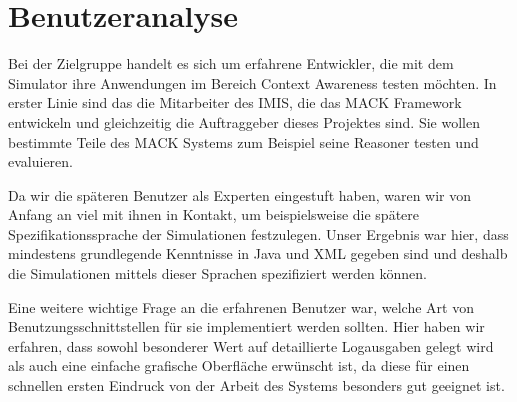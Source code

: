 %

\section{Benutzeranalyse}\label{sec:user_ana}

Bei der Zielgruppe handelt es sich um erfahrene Entwickler, die mit dem Simulator ihre Anwendungen im Bereich Context Awareness testen möchten. In erster Linie sind das die Mitarbeiter des IMIS, die das MACK Framework entwickeln und gleichzeitig die Auftraggeber dieses Projektes sind. Sie wollen bestimmte Teile des MACK Systems zum Beispiel seine Reasoner testen und evaluieren.

Da wir die späteren Benutzer als Experten eingestuft haben, waren wir von Anfang an viel mit ihnen in Kontakt, um beispielsweise die spätere Spezifikationssprache der Simulationen festzulegen. Unser Ergebnis war hier, dass mindestens grundlegende Kenntnisse in Java und XML gegeben sind und deshalb die Simulationen mittels dieser Sprachen spezifiziert werden können.

Eine weitere wichtige Frage an die erfahrenen Benutzer war, welche Art von Benutzungsschnittstellen für sie implementiert werden sollten. Hier haben wir erfahren, dass sowohl besonderer Wert auf detaillierte Logausgaben gelegt wird als auch eine einfache grafische Oberfläche erwünscht ist, da diese für einen schnellen ersten Eindruck von der Arbeit des Systems besonders gut geeignet ist.

